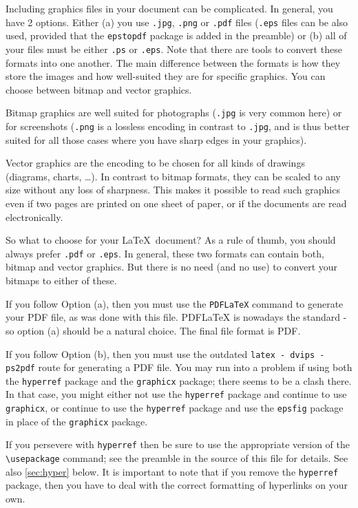 \documentclass{scspaperproc}
\theoremstyle{scsthe}
\begin{document}
Including graphics files in your document can be complicated. In general, you have 2 options. Either (a) you use \texttt{.jpg}, \texttt{.png} or \texttt{.pdf} files (\texttt{.eps} files can be also used, provided that the \texttt{epstopdf} package is added in the preamble) or (b) all of your files must be either \texttt{.ps} or \texttt{.eps}.
Note that there are tools to convert these formats into one another. The main difference between the formats is how they store the images and how well-suited they are for specific graphics. You can choose between bitmap and vector graphics.

Bitmap graphics are well suited for photographs (\texttt{.jpg} is very common here) or for screenshots (\texttt{.png} is a lossless encoding in contrast to \texttt{.jpg}, and is thus better suited for all those cases where you have sharp edges in your graphics).

Vector graphics are the encoding to be chosen for all kinds of drawings (diagrams, charts, \ldots). In contrast to bitmap formats, they can be scaled to any size without any loss of sharpness. This makes it possible to read such graphics even if two pages are printed on one sheet of paper, or if the documents are read electronically.

So what to choose for your \LaTeX\ document? As a rule of thumb, you should always prefer \texttt{.pdf} or \texttt{.eps}.
In general, these two formats can contain both, bitmap and vector graphics. But there is no need (and no use) to convert your bitmaps to either of these.

If you follow Option (a), then you must use the \texttt{PDFLaTeX} command to generate your PDF file, as was done with this file. PDFLaTeX is nowadays the standard - so option (a) should be a natural choice. The final file format is PDF.

If you follow Option (b), then you must use the outdated \texttt{latex - dvips - ps2pdf} route for generating a PDF file. You may run into a problem if using both the \texttt{hyperref} package and the \texttt{graphicx} package; there seems to be a clash there.
In that case, you might either not use the \texttt{hyperref} package and continue to use \texttt{graphicx}, or continue to use the \texttt{hyperref} package and use the \texttt{epsfig} package in place of the \texttt{graphicx} package.

If you persevere with \texttt{hyperref} then be sure to use the appropriate version of the \verb+\usepackage+ command; see the preamble in the source of this file for details. See also \autoref{sec:hyper} below. It is important to note that if you remove the \texttt{hyperref} package, then you have to deal with the correct formatting of hyperlinks on your own.
\end{document}
